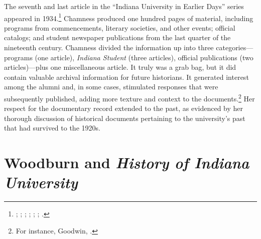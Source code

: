 \documentclass[
  american,
  letterpaper,
]{scrreprt}
\begin{document}
The seventh and last article in the ``Indiana University in Earlier
Days'' series appeared in 1934.\footnote{;
  ; ;
  ; ;
  ;
  .} Chamness produced one hundred pages of
material, including programs from commencements, literary societies, and
other events; official catalogs; and student newspaper publications from
the last quarter of the nineteenth century. Chamness divided the
information up into three categories---programs (one article),
\emph{Indiana Student} (three articles), official publications (two
articles)---plus one miscellaneous article. It truly was a grab bag, but
it did contain valuable archival information for future historians. It
generated interest among the alumni and, in some cases, stimulated
responses that were subsequently published, adding more texture and
context to the documents.\footnote{For instance, Goodwin,
  .} Her respect for the documentary
record extended to the past, as evidenced by her thorough discussion of
historical documents pertaining to the university's past that had
survived to the 1920s.

\section{\texorpdfstring{Woodburn and \emph{History of Indiana
University}}{Woodburn and History of Indiana University}}\label{woodburn-and-history-of-indiana-university}
\end{document}
